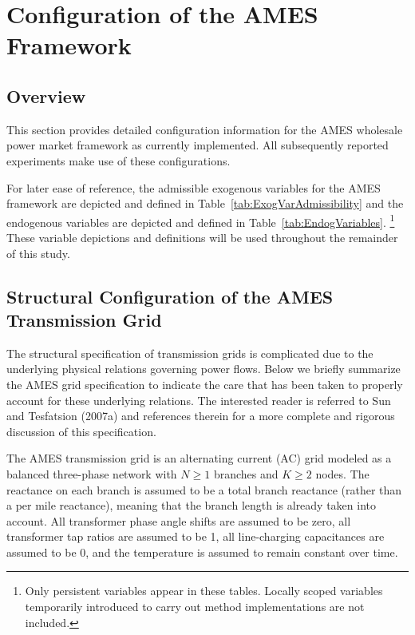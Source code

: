 \documentclass[12pt]{article}
\begin{document}
\section{Configuration of the AMES Framework \label{AMESConfig} }


\subsection{Overview \label{classification} }

This section provides detailed configuration information for the AMES wholesale power market framework as currently implemented.  All subsequently reported experiments make use of these configurations.

For later ease of reference, the admissible exogenous variables for the AMES framework are depicted and defined in 
Table~\ref{tab:ExogVarAdmissibility} and the endogenous variables are depicted and defined in 
Table~\ref{tab:EndogVariables}.%
    \footnote{Only persistent variables appear in these tables.  Locally scoped variables temporarily introduced to carry out method implementations are not included.}
    These variable depictions and definitions will be used throughout the remainder of this study.

\subsection{Structural Configuration of the AMES Transmission Grid \label{InitGrid} }

\noindent
The structural specification of transmission grids is complicated due to the underlying physical relations governing power flows.  Below we briefly summarize the AMES grid specification to indicate the care that has been taken to properly account for these underlying relations.  The interested reader is referred to Sun and Tesfatsion (2007a) and references therein for a more complete and rigorous discussion of this specification.

The AMES transmission grid is an alternating current (AC) grid modeled as a
balanced three-phase network with $N\ge 1$ branches and $K \ge 2$ nodes. 
The reactance on each branch is assumed to be a total branch reactance (rather than a per mile 
reactance), meaning that the branch length is already taken into account. All transformer 
phase angle shifts are assumed to be zero, all transformer tap ratios are assumed 
to be 1, all line-charging capacitances are assumed to be 0, and the temperature is 
assumed to remain constant over time.
\end{document}
